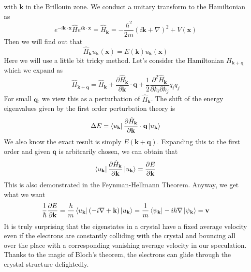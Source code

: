 \documentclass{article}
\begin{document}
with $\mathbf{k}$ in the Brillouin zone. We conduct a unitary transform to the Hamiltonian as\begin{equation}
    e^{-i\mathbf{k}\cdot\mathbf{x}}\hat{H}e^{i\mathbf{k}\cdot\mathbf{x}}=\hat{H}_\mathbf{k}=-\frac{\hbar^2}{2m}(i\mathbf{k}+\nabla)^2+V(\mathbf{x})
\end{equation}Then we will find out that\begin{equation}
    \hat{H}_\mathbf{k}u_\mathbf{k}(\mathbf{x})=E(\mathbf{k})u_\mathbf{k}(\mathbf{x})
\end{equation}Here we will use a little bit tricky method. Let's consider the Hamiltonian $H_{\mathbf{k}+\mathbf{q}}$ which we expand as\begin{equation}
    \hat{H}_{\mathbf{k}+\mathbf{q}}=\hat{H}_{\mathbf{k}}+\frac{\partial\hat{H}_\mathbf{k}}{\partial\mathbf{k}}\cdot\mathbf{q}+\frac12\frac{\partial^2\hat{H}_\mathbf{k}}{\partial{k}_i\partial{k}_j}q_iq_j
\end{equation}For small $\mathbf{q}$, we view this as a perturbation of $\hat{H}_\mathbf{k}$. The shift of the energy eigenvalues given by the first order perturbation theory is\begin{equation}
    \Delta{E}=\bra{u_\mathbf{k}}\frac{\partial\hat{H}_\mathbf{k}}{\partial\mathbf{k}}\cdot\mathbf{q}\ket{u_\mathbf{k}}
\end{equation}We also know the exact result is simply $E(\mathbf{k}+\mathbf{q})$. Expanding this to the first order and given $\mathbf{q}$ is arbitrarily chosen, we can obtain that\begin{equation}
    \bra{u_\mathbf{k}}\frac{\partial\hat{H}_\mathbf{k}}{\partial\mathbf{k}}\ket{u_\mathbf{k}}=\frac{\partial{E}}{\partial\mathbf{k}}
\end{equation}This is also demonstrated in the Feynman-Hellmann Theorem. Anyway, we get what we want\begin{equation}
    \frac{1}{\hbar}\frac{\partial{E}}{\partial\mathbf{k}}=\frac{\hbar}{m}\bra{u_\mathbf{k}}(-i\nabla+\mathbf{k})\ket{u_\mathbf{k}}=\frac1m\bra{\psi_\mathbf{k}}-i\hbar\nabla\ket{\psi_\mathbf{k}}=\mathbf{v}
\end{equation}It is truly surprising that the eigenstates in a crystal have a fixed average velocity even if the electrons are constantly colliding with the crystal and bouncing all over the place with a corresponding vanishing average velocity in our speculation. Thanks to the magic of Bloch's theorem, the electrons can glide through the crystal structure delightedly.\\
\end{document}
